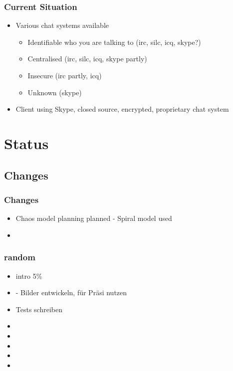 \documentclass{beamer}
\begin{document}
\frame
{
  \frametitle{Current Situation}
  \begin{itemize}
      \item Various chat systems available
      \begin{itemize}
          \item Identifiable who you are talking to (irc, silc, icq, skype?)
          \item Centralised (irc, silc, icq, skype partly)
          \item Insecure (irc partly, icq)
          \item Unknown (skype)
      \end{itemize}
      \item Client using Skype, closed source, encrypted, proprietary chat system
  \end{itemize}
}

\section{Status}
\subsection{Changes}
\frame
{
  \frametitle{Changes}
  \begin{itemize}
    \item Chaos model planning planned - \alert{Spiral model used}
    \item 
  \end{itemize}
}

\frame
{
  \frametitle{random}
  \begin{itemize}
    \item intro 5\%
    \item         - Bilder entwickeln, für Präsi nutzen
    \item  Tests schreiben
    \item 
    \item 
    \item 
    \item 
    \item 
  \end{itemize}
}
\end{document}
